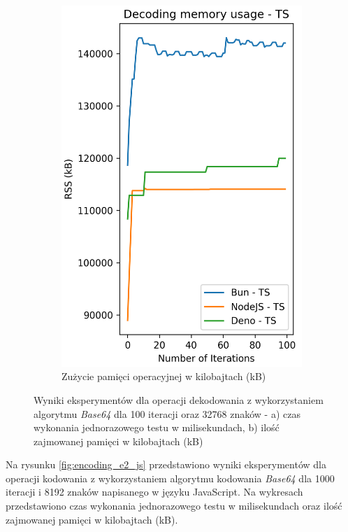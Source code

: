 \begin{figure}[H]
\begin{subfigure}[b]{0.42\textwidth}
    \includegraphics[width=\textwidth]{Figures/coding/base64_100_decoding_ts_memory.png}
    \caption{Zużycie pamięci operacyjnej w kilobajtach (kB)}
    \label{fig:decoding_e1_ts_memory}
  \end{subfigure}
  \hfill
  \caption{Wyniki eksperymentów dla operacji dekodowania z wykorzystaniem algorytmu \textit{Base64} dla 100 iteracji oraz 32768 znaków - a) czas wykonania jednorazowego testu w milisekundach, b) ilość zajmowanej pamięci w kilobajtach (kB)}
  \label{fig:decoding_e1_ts}
\end{figure}

Na rysunku \ref{fig:encoding_e2_js} przedstawiono wyniki eksperymentów dla operacji kodowania z wykorzystaniem algorytmu kodowania \textit{Base64} dla 1000 iteracji i 8192 znaków napisanego w języku JavaScript. Na wykresach przedstawiono czas wykonania jednorazowego testu w milisekundach oraz ilość zajmowanej pamięci w kilobajtach (kB).

